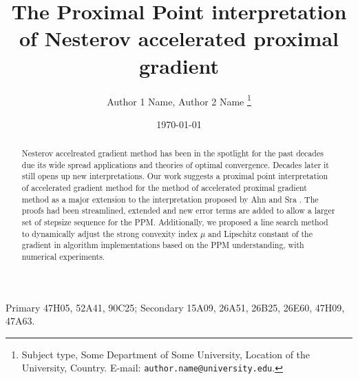 \documentclass[12pt]{article}
\begin{document}
\title{{\selectfont The Proximal Point interpretation of Nesterov accelerated proximal gradient}}

\author{
    Author 1 Name, Author 2 Name
    \thanks{
        Subject type, Some Department of Some University, Location of the University,
        Country. E-mail: \texttt{author.name@university.edu}.
    }
}

\date{\today}

\maketitle


\begin{abstract} 
    \noindent
    Nesterov accelreated gradient method has been in the spotlight for the past decades due its wide spread applications and theories of optimal convergence. 
    Decades later it still opens up new interpretations. 
    Our work suggests a proximal point interpretation of accelerated gradient method for the method of accelerated proximal gradient method as a major extension to the interpretation proposed by Ahn and Sra \cite{ahn_understanding_2022}. 
    The proofs had been streamlined, extended and new error terms are added to allow a larger set of stepsize sequence for the PPM. 
    Additionally, we proposed a line search method to dynamically adjust the strong convexity index $\mu$ and Lipschitz constant of the gradient in algorithm implementations based on the PPM understanding, with numerical experiments. 
    
\end{abstract}

Primary 47H05, 52A41, 90C25; Secondary 15A09, 26A51, 26B25, 26E60, 47H09, 47A63.
\end{document}
